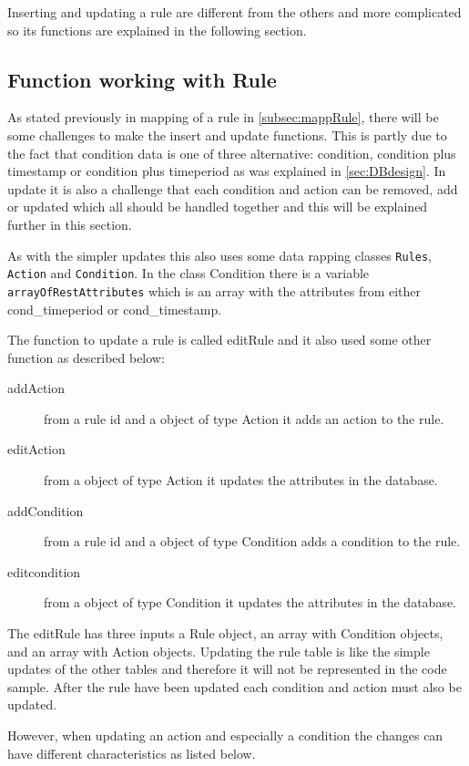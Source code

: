 Inserting and updating a rule are different from the others and more complicated so its functions are explained in the following section. 

\subsection{Function working with Rule}
\label{subsec:dbRule}


As stated previously in mapping of a rule in \vref{subsec:mappRule}, there will be some challenges to make the insert and update functions. This is partly due to the fact that condition data is one of three alternative: condition, condition plus timestamp or condition plus timeperiod as was explained in \vref{sec:DBdesign}.
In update it is also a challenge that each condition and action can be removed, add or updated which all should be handled together and this will be explained further in this section. 

As with the simpler updates this also uses some data rapping classes \texttt{Rules}, \texttt{Action} and \texttt{Condition}. In the class Condition there is a variable \texttt{arrayOfRestAttributes} which is an array with the attributes from either cond\_timeperiod or cond\_timestamp.

The function to update a rule is called editRule and it also used some other function as described below:

\begin{description}
	\item[addAction] from a rule id and a object of type Action it adds an action to the rule.
	\item[editAction] from a object of type Action it updates the attributes in the database.   
	\item[addCondition] from a rule id and a object of type Condition adds a condition to the rule.
	\item[editcondition] from a object of type Condition it updates the attributes in the database.   
\end{description}

The editRule has three inputs a Rule object, an array with Condition objects, and an array with Action objects. Updating the rule table is like the simple updates of the other tables and therefore it will not be represented in the code sample. After the rule have been updated each condition and action must also be updated. 

However, when updating an action and especially a condition the changes can have different characteristics as listed below.

